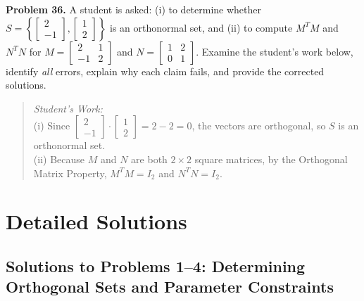 \documentclass[11pt, letterpaper]{article}
\theoremstyle{definition}
\theoremstyle{remark}
\begin{document}
\textbf{Problem 36.} A student is asked: (i) to determine whether $S = \left\{\begin{bmatrix} 2 \\ -1 \end{bmatrix}, \begin{bmatrix} 1 \\ 2 \end{bmatrix}\right\}$ is an orthonormal set, and (ii) to compute $M^T M$ and $N^T N$ for $M = \begin{bmatrix} 2 & 1 \\ -1 & 2 \end{bmatrix}$ and $N = \begin{bmatrix} 1 & 2 \\ 0 & 1 \end{bmatrix}$. Examine the student's work below, identify \textit{all} errors, explain why each claim fails, and provide the corrected solutions.
\begin{quote}
\textit{Student's Work:} \\
(i) Since $\begin{bmatrix} 2 \\ -1 \end{bmatrix} \cdot \begin{bmatrix} 1 \\ 2 \end{bmatrix} = 2 - 2 = 0$, the vectors are orthogonal, so $S$ is an orthonormal set. \\
(ii) Because $M$ and $N$ are both $2 \times 2$ square matrices, by the Orthogonal Matrix Property, $M^T M = I_2$ and $N^T N = I_2$.
\end{quote}

\newpage

\section{Detailed Solutions}

\subsection{Solutions to Problems 1--4: Determining Orthogonal Sets and Parameter Constraints}
\end{document}
